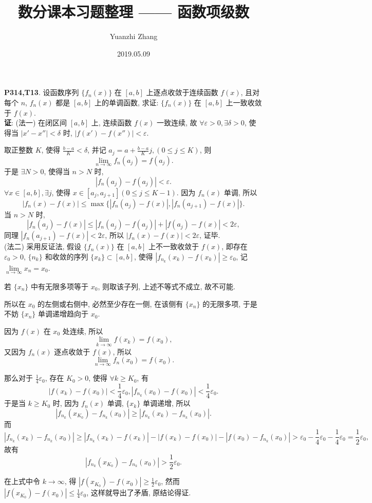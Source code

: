 \documentclass[UTF8]{ctexart}
\title{数分课本习题整理 —— 函数项级数}
\author{Yuanzhi Zhang}
\date{2019.05.09}
\begin{document}
\maketitle
\textbf{P314,T13}. 设函数序列 $\{f_n(x)\}$ 在 $[a,b]$ 上逐点收敛于连续函数 $f(x)$, 且对每个 $n$, $f_n(x)$ 都是 $[a,b]$ 上的单调函数, 求证: $\{f_n(x)\}$ 在 $[a,b]$ 上一致收敛于 $f(x)$.
~\\

\textbf{证}: (法一) 在闭区间 $[a,b]$ 上, 连续函数 $f(x)$ 一致连续, 故 $\forall \varepsilon>0,\exists \delta>0$, 使得当 $|x'-x''|<\delta$ 时, $|f(x')-f(x'')|<\varepsilon$.

取正整数 $K$, 使得 $\displaystyle\frac{b-a}{K}<\delta$, 并记 $a_j=a+\displaystyle\frac{b-a}{K}j,(0\leq j\leq K)$, 则
\[
\lim\limits_{n\rightarrow\infty}f_n(a_j)=f(a_j).
\]
于是 $\exists N>0$, 使得当 $n>N$ 时,
\[
|f_n(a_j)-f(a_j)|<\varepsilon.
\]
$\forall x\in[a,b], \exists j$, 使得 $x\in[a_j,a_{j+1}](0\leq j \leq K-1)$. 因为 $f_n(x)$ 单调, 所以
\[
|f_n(x)-f(x)|\leq \max\{|f_n(a_j)-f(x)|,|f_n(a_{j+1})-f(x)|\}.
\]
当 $n>N$ 时,
\[
|f_n(a_j)-f(x)|\leq|f_n(a_j)-f(a_j)|+|f(a_j)-f(x)|<2\varepsilon,
\]
同理 $|f_n(a_{j+1})-f(x)|<2\varepsilon$, 所以 $|f_n(x)-f(x)|<2\varepsilon$, 证毕.
~\\

(法二) 采用反证法, 假设 $\{f_n(x)\}$ 在 $[a,b]$ 上不一致收敛于 $f(x)$, 即存在 $\varepsilon_0>0$, $\{n_k\}$ 和收敛的序列 $\{x_k\}\subset[a,b]$, 使得 $|f_{n_k}(x_k)-f(x_k)|\geq\varepsilon_0$, 记  $\lim\limits_{n\rightarrow\infty}x_n=x_0$.

若 $\{x_n\}$ 中有无限多项等于 $x_0$, 则取该子列, 上述不等式不成立, 故不可能.

所以在 $x_0$ 的左侧或右侧中, 必然至少存在一侧, 在该侧有 $\{x_n\}$ 的无限多项, 于是不妨 $\{x_n\}$ 单调递增趋向于 $x_0$.

因为 $f(x)$ 在 $x_0$ 处连续, 所以
\[
\lim\limits_{k\rightarrow\infty}f(x_k)=f(x_0),
\]
又因为 $f_n(x)$ 逐点收敛于 $f(x)$, 所以
\[
\lim\limits_{n\rightarrow\infty}f_n(x_0)=f(x_0).
\]

那么对于 $\displaystyle\frac{1}{4}\varepsilon_0$, 存在 $K_0>0$, 使得 $\forall k\geq K_0$, 有
\[
|f(x_k)-f(x_0)|<\frac{1}{4}\varepsilon_0, |f_{n_k}(x_0)-f(x_0)|<\frac{1}{4}\varepsilon_0.
\]
于是当 $k\geq K_0$ 时, 因为 $f_n(x)$ 单调, $\{x_k\}$ 单调递增, 所以
\[
|f_{n_k}(x_{K_0})-f_{n_k}(x_0)|\geq |f_{n_k}(x_k)-f_{n_k}(x_0)|.
\]
而
\[
|f_{n_k}(x_k)-f_{n_k}(x_0)|\geq |f_{n_k}(x_k)-f(x_k)|-|f(x_k)-f(x_0)|-|f(x_0)-f_{n_k}(x_0)|>\varepsilon_0-\frac{1}{4}\varepsilon_0-\frac{1}{4}\varepsilon_0=\frac{1}{2}\varepsilon_0,
\]
故有
\[
|f_{n_k}(x_{K_0})-f_{n_k}(x_0)|>\displaystyle\frac{1}{2}\varepsilon_0.
\]

在上式中令 $k\rightarrow\infty$, 得 $|f(x_{K_0})-f(x_0)|\geq\displaystyle\frac{1}{2}\varepsilon_0$, 然而 $|f(x_{K_0})-f(x_0)|\leq\displaystyle\frac{1}{4}\varepsilon_0$, 这样就导出了矛盾, 原结论得证.
\end{document}
